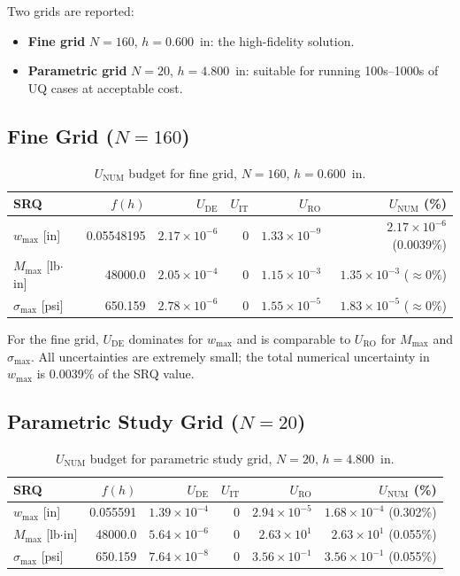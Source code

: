 \documentclass[11pt,letterpaper]{article}
\newcommand{\UDE}{U_{\mathrm{DE}}}
\newcommand{\UIT}{U_{\mathrm{IT}}}
\newcommand{\URO}{U_{\mathrm{RO}}}
\newcommand{\UNUM}{U_{\mathrm{NUM}}}
\begin{document}
Two grids are reported:
\begin{itemize}[nosep]
  \item \textbf{Fine grid} $N=160$, $h=0.600$~in: the high-fidelity solution.
  \item \textbf{Parametric grid} $N=20$, $h=4.800$~in: suitable for running
    100s--1000s of UQ cases at acceptable cost.
\end{itemize}

\subsection{Fine Grid (\texorpdfstring{$N=160$}{N=160})}

\begin{table}[h!]
\centering
\caption{$\UNUM$ budget for fine grid, $N=160$, $h=0.600$~in.}
\label{tab:unum160}
\begin{tabular}{lrrrrr}
  \toprule
  SRQ & $f(h)$ & $\UDE$ & $\UIT$ & $\URO$ & $\UNUM$ (\%) \\
  \midrule
  $w_{\max}$ [in]          & 0.05548195 & $2.17\times10^{-6}$ & 0 & $1.33\times10^{-9}$ & $2.17\times10^{-6}$ \;(0.0039\%) \\
  $M_{\max}$ [lb$\cdot$in] & 48000.0    & $2.05\times10^{-4}$ & 0 & $1.15\times10^{-3}$ & $1.35\times10^{-3}$ \;($\approx0\%$) \\
  $\sigma_{\max}$ [psi]    & 650.159    & $2.78\times10^{-6}$ & 0 & $1.55\times10^{-5}$ & $1.83\times10^{-5}$ \;($\approx0\%$) \\
  \bottomrule
\end{tabular}
\end{table}

For the fine grid, $\UDE$ dominates for $w_{\max}$ and is comparable
to $\URO$ for $M_{\max}$ and $\sigma_{\max}$.  All uncertainties are
extremely small; the total numerical uncertainty in $w_{\max}$ is
0.0039\% of the SRQ value.

\subsection{Parametric Study Grid (\texorpdfstring{$N=20$}{N=20})}

\begin{table}[h!]
\centering
\caption{$\UNUM$ budget for parametric study grid, $N=20$, $h=4.800$~in.}
\label{tab:unum20}
\begin{tabular}{lrrrrr}
  \toprule
  SRQ & $f(h)$ & $\UDE$ & $\UIT$ & $\URO$ & $\UNUM$ (\%) \\
  \midrule
  $w_{\max}$ [in]          & 0.055591 & $1.39\times10^{-4}$ & 0 & $2.94\times10^{-5}$ & $1.68\times10^{-4}$ \;(0.302\%) \\
  $M_{\max}$ [lb$\cdot$in] & 48000.0  & $5.64\times10^{-6}$ & 0 & $2.63\times10^{1}$  & $2.63\times10^{1}$  \;(0.055\%) \\
  $\sigma_{\max}$ [psi]    & 650.159  & $7.64\times10^{-8}$ & 0 & $3.56\times10^{-1}$ & $3.56\times10^{-1}$ \;(0.055\%) \\
  \bottomrule
\end{tabular}
\end{table}
\end{document}
